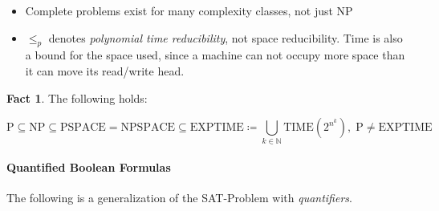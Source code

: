 \documentclass[10pt,fleqn]{article}
\theoremstyle{definition}
\newtheorem{fact}{Fact}
\theoremstyle{remark}
\newcommand{\pclass}{\text{P}}
\newcommand{\npclass}{\text{NP}}
\newcommand{\pspaceclass}{\text{PSPACE}}
\newcommand{\npspaceclass}{\text{NPSPACE}}
\newcommand{\exptimeclass}{\text{EXPTIME}}
\begin{document}
\begin{itemize}
    \item Complete problems exist for many complexity classes, not just NP
    \item \(\leq_p\) denotes \emph{polynomial time reducibility}, not space reducibility. Time is also a bound for the space used, since a machine can not occupy more space than it can move its read/write head.
\end{itemize}
\begin{fact} The following holds:
    \begin{ceqn}
        \[
            \pclass \subseteq \npclass \subseteq \pspaceclass = \npspaceclass \subseteq \exptimeclass \coloneqq \bigcup_{k \in \mathbb{N}} \text{TIME}\left(2^{n^k}\right), \; \pclass \neq \exptimeclass
        \]
    \end{ceqn}
\end{fact}

\newpage

\paragraph*{Quantified Boolean Formulas} The following is a generalization of the SAT-Problem with \emph{quantifiers}.
\end{document}
